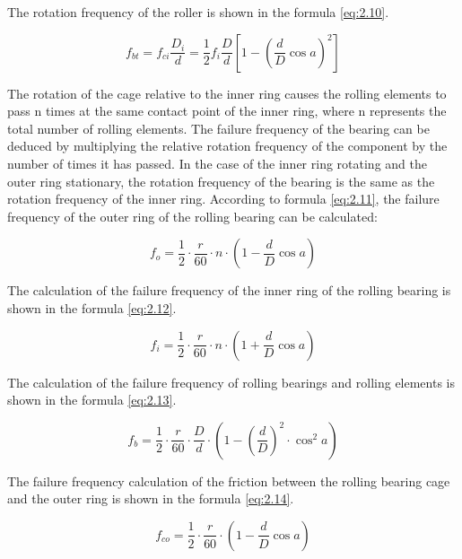\documentclass{article}
\begin{document}
The rotation frequency of the roller is shown in the formula \ref{eq:2.10}.

\begin{equation}
    f_{bt} = f_{ci} \frac{D_i}{d} = \frac{1}{2} f_i \frac{D}{d} \left[ 1 - \left( \frac{d}{D} \cos a \right)^2 \right]
    \label{eq:2.10}
\end{equation}

The rotation of the cage relative to the inner ring causes the rolling elements to pass n times at the same contact point of the inner ring, where n represents the total number of rolling elements. The failure frequency of the bearing can be deduced by multiplying the relative rotation frequency of the component by the number of times it has passed. In the case of the inner ring rotating and the outer ring stationary, the rotation frequency of the bearing is the same as the rotation frequency of the inner ring. According to formula \ref{eq:2.11}, the failure frequency of the outer ring of the rolling bearing can be calculated:

\begin{equation}
    f_o = \frac{1}{2} \cdot \frac{r}{60} \cdot n \cdot \left( 1 - \frac{d}{D} \cos a \right)
    \label{eq:2.11}
\end{equation}

The calculation of the failure frequency of the inner ring of the rolling bearing is shown in the formula \ref{eq:2.12}.

\begin{equation}
    f_i = \frac{1}{2} \cdot \frac{r}{60} \cdot n \cdot \left( 1 + \frac{d}{D} \cos a \right)
    \label{eq:2.12}
\end{equation}

The calculation of the failure frequency of rolling bearings and rolling elements is shown in the formula \ref{eq:2.13}.

\begin{equation}
    f_b = \frac{1}{2} \cdot \frac{r}{60} \cdot \frac{D}{d} \cdot \left( 1 - \left( \frac{d}{D} \right)^2 \cdot \cos^2 a \right)
    \label{eq:2.13}    
\end{equation}

The failure frequency calculation of the friction between the rolling bearing cage and the outer ring is shown in the formula \ref{eq:2.14}.

\begin{equation}
    f_{co} = \frac{1}{2} \cdot \frac{r}{60} \cdot \left( 1 - \frac{d}{D} \cos a \right)
    \label{eq:2.14}
\end{equation}
\end{document}
